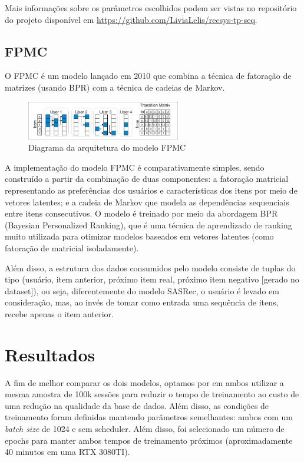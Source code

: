 Mais informações sobre os parâmetros escolhidos podem ser vistas
no repositório do projeto disponível em \url{https://github.com/LiviaLelis/recsys-tp-seq}.

\subsection*{FPMC}

O FPMC \cite{fpmc} é um modelo lançado em 2010 que combina a técnica de 
fatoração de matrizes (usando BPR) com a técnica de cadeias de Markov.

\begin{figure}[H]
    \centering
    \includegraphics[width=0.6\textwidth]{../assets/fpmc-diagram.png}
    \caption{Diagrama da arquitetura do modelo FPMC \cite{fpmc}}
    \label{fig:fpmc-diagram}
\end{figure}

A implementação do modelo FPMC é comparativamente simples, sendo construído a
partir da combinação de duas componentes: a fatoração matricial representando
as preferências dos usuários e características dos itens por meio de vetores
latentes; e a cadeia de Markov que modela as dependências sequenciais entre
itens consecutivos. O modelo é treinado por meio da abordagem BPR (Bayesian
Personalized Ranking), que é uma técnica de aprendizado de ranking muito
utilizada para otimizar modelos baseados em vetores latentes (como fatoração
de matricial isoladamente).

Além disso, a estrutura dos dados consumidos pelo modelo consiste de tuplas do
tipo (usuário, item anterior, próximo item real, próximo item negativo
[gerado no dataset]), ou seja, diferentemente do modelo SASRec, o usuário é
levado em consideração, mas, ao invés de tomar como entrada uma sequência de
itens, recebe apenas o item anterior.

\section*{Resultados}

A fim de melhor comparar os dois modelos, optamos por em ambos utilizar a mesma
amostra de 100k sessões para reduzir o tempo de treinamento ao custo de uma
redução na qualidade da base de dados. Além disso, as condições de treinamento
foram definidas mantendo parâmetros semelhantes: ambos com um \textit{batch size}
de 1024 e sem scheduler. Além disso, foi selecionado um número de epochs para 
manter ambos tempos de treinamento próximos (aproximadamente 40 minutos em uma
RTX 3080TI).

